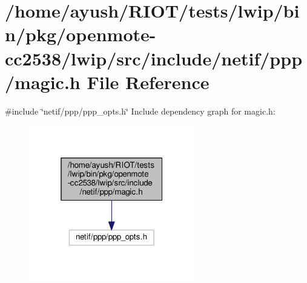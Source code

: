 \hypertarget{openmote-cc2538_2lwip_2src_2include_2netif_2ppp_2magic_8h}{}\section{/home/ayush/\+R\+I\+O\+T/tests/lwip/bin/pkg/openmote-\/cc2538/lwip/src/include/netif/ppp/magic.h File Reference}
\label{openmote-cc2538_2lwip_2src_2include_2netif_2ppp_2magic_8h}
{\ttfamily \#include \char`\"{}netif/ppp/ppp\+\_\+opts.\+h\char`\"{}}\newline
Include dependency graph for magic.\+h\+:
\nopagebreak
\begin{figure}[H]
\begin{center}
\leavevmode
\includegraphics[width=205pt]{openmote-cc2538_2lwip_2src_2include_2netif_2ppp_2magic_8h__incl}
\end{center}
\end{figure}
